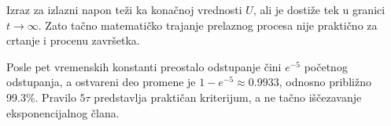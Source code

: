 Izraz za izlazni napon teži ka konačnoj vrednosti $U$, ali je dostiže tek u granici $t\to\infty$. Zato tačno matematičko trajanje prelaznog procesa nije praktično za crtanje i procenu završetka.

Posle pet vremenskih konstanti preostalo odstupanje čini $e^{-5}$ početnog odstupanja, a ostvareni deo promene je $1-e^{-5}\approx0.9933$, odnosno približno 99.3\%. Pravilo $5\tau$ predstavlja praktičan kriterijum, a ne tačno iščezavanje eksponencijalnog člana.
